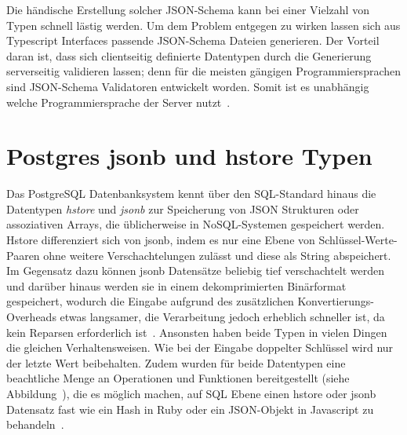 Die händische Erstellung solcher JSON-Schema kann bei einer Vielzahl von Typen schnell lästig werden.
Um dem Problem entgegen zu wirken lassen sich aus Typescript Interfaces passende JSON-Schema Dateien generieren.
Der Vorteil daran ist, dass sich clientseitig definierte Datentypen durch die Generierung serverseitig validieren lassen;
denn für die meisten gängigen Programmiersprachen sind JSON-Schema Validatoren entwickelt worden.
Somit ist es unabhängig welche Programmiersprache der Server nutzt~\cite{json-schema-implementations}.


\section{Postgres jsonb und hstore Typen}
\label{sec:basics:postgres}
Das PostgreSQL Datenbanksystem kennt über den SQL-Standard hinaus die Datentypen \emph{hstore} und \emph{jsonb} zur Speicherung von JSON Strukturen oder assoziativen Arrays,
die üblicherweise in NoSQL-Systemen gespeichert werden.
Hstore differenziert sich von jsonb, indem es nur eine Ebene von Schlüssel-Werte-Paaren ohne weitere Verschachtelungen zulässt und
diese als String abspeichert.
Im Gegensatz dazu können jsonb Datensätze beliebig tief verschachtelt werden und
darüber hinaus werden sie in einem dekomprimierten Binärformat gespeichert, wodurch die Eingabe aufgrund des zusätzlichen Konvertierungs-Overheads etwas langsamer,
die Verarbeitung jedoch erheblich schneller ist, da kein Reparsen erforderlich ist~\cite{postgresql-json}.
Ansonsten haben beide Typen in vielen Dingen die gleichen Verhaltensweisen. Wie bei der Eingabe doppelter Schlüssel wird nur der letzte Wert beibehalten.
Zudem wurden für beide Datentypen eine beachtliche Menge an Operationen und Funktionen bereitgestellt (siehe Abbildung~), die es möglich machen,
auf SQL Ebene einen hstore oder jsonb Datensatz fast wie ein Hash in Ruby oder ein JSON-Objekt in Javascript zu behandeln~\cite{postgresql-hstore}.

